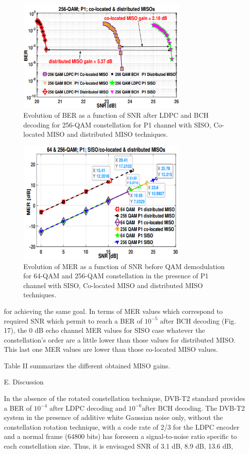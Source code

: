 \documentclass[10pt, conference]{IEEEtran}
\begin{document}
\linespread{1}
\begin{figure}[!htbp]
\centering
\includegraphics[width=8.5cm]{images/img3.png}
    \caption{ Evolution of BER as a function of SNR after LDPC and BCH decoding for 256-QAM constellation for P1 channel with SISO, Co-located MISO and distributed MISO techniques.}
\end{figure}

\begin{figure}[!htbp]
\centering
\includegraphics[width=8.5cm]{images/img4.png}
    \caption{Evolution of MER as a function of SNR before QAM demodulation for 64-QAM and 256-QAM constellation in the presence of P1 channel with SISO, Co-located MISO and distributed MISO techniques.}
\end{figure}

\normalsize{
for achieving the same goal. In terms of MER values which correspond to required SNR which permit to reach a BER of $10^{-5}$ after BCH decoding (Fig. 17), the 0 dB echo channel MER values for SISO case whatever the constellation’s order are a little lower than those values for distributed MISO. This last one MER values are lower than those co-located MISO values. 

Table II summarizes the different obtained MISO gains.

E. Discussion

In the absence of the rotated constellation technique, DVB-T2 standard provides a BER of $10^{-4}$ after LDPC decoding and $10^{-6}$after BCH decoding. The DVB-T2 system in the presence of additive white Gaussian noise only, without the constellation rotation technique, with a code rate of 2/3 for the LDPC encoder and a normal frame (64800 bits) has foreseen a signal-to-noise ratio specific to each constellation size. Thus, it is envisaged SNR of 3.1 dB, 8.9 dB, 13.6 dB,
}
\end{document}
